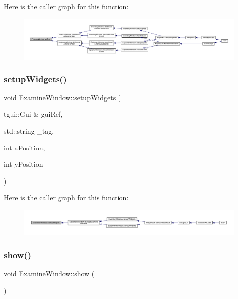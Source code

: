 Here is the caller graph for this function\+:
\nopagebreak
\begin{figure}[H]
\begin{center}
\leavevmode
\includegraphics[width=350pt]{d0/d28/class_examine_window_ab88efb6bed6125a0c941ce70a360baf0_icgraph}
\end{center}
\end{figure}
\mbox{\label{class_examine_window_a15f26e824ea2849573ce7a0664adc192}} 
\subsubsection{\texorpdfstring{setup\+Widgets()}{setupWidgets()}}
{\footnotesize\ttfamily void Examine\+Window\+::setup\+Widgets (\begin{DoxyParamCaption}\item[{tgui\+::\+Gui \&}]{gui\+Ref,  }\item[{std\+::string}]{\+\_\+tag,  }\item[{int}]{x\+Position,  }\item[{int}]{y\+Position }\end{DoxyParamCaption})}

Here is the caller graph for this function\+:
\nopagebreak
\begin{figure}[H]
\begin{center}
\leavevmode
\includegraphics[width=350pt]{d0/d28/class_examine_window_a15f26e824ea2849573ce7a0664adc192_icgraph}
\end{center}
\end{figure}
\mbox{\label{class_examine_window_a5d93b356de906a2b4891b8ff79425b90}} 
\subsubsection{\texorpdfstring{show()}{show()}}
{\footnotesize\ttfamily void Examine\+Window\+::show (\begin{DoxyParamCaption}{ }\end{DoxyParamCaption})}

